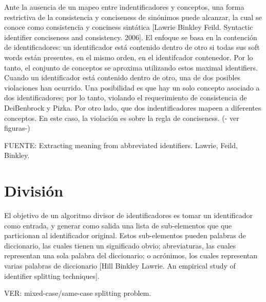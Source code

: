 Ante la ausencia de un mapeo entre indentificadores y conceptos, una forma restrictiva de la consistencia y conciseness de sinónimos puede alcanzar, la cual se conoce como consistencia y conciness sintática [Lawrie Binkley Feild. Syntactic identifier conciseness and consistency. 2006]. 
El enfoque se basa en la contención de identificadores: un identificador está contenido dentro de otro si todas sus soft words están presentes, en el mismo orden, en el identifcador contenedor. 
Por lo tanto, el conjunto de conceptos se aproxima utilizando estos maximal identifiers.
Cuando un identificador está contenido dentro de otro, una de dos posibles violaciones han ocurrido. Una posibilidad es que hay un solo concepto asociado a dos identificadores; por lo tanto, violando el requerimiento de consistencia de DeiBenbrock y Pizka. Por otro lado, que dos indentificadores mapeen a diferentes conceptos. En este caso, la violación es sobre la regla de conciseness. (- ver figuras-)

FUENTE: Extracting meaning from abbreviated identifiers. Lawrie, Feild, Binkley.

\section{División}
El objetivo de un algoritmo divisor de identificadores es tomar un identificador como entrada, y generar como salida
 una lista de sub-elementos que que particionan al identificador original. Estos sub-elementos pueden palabras de diccionario, las cuales tienen un significado obvio; abreviaturas, las cuales representan una sola palabra del diccionario; o acrónimos, los cuales representan varias palabras de diccionario [Hill Binkley Lawrie. An empirical study of identifier splitting techniques].

VER: mixed-case/same-case splitting problem.

